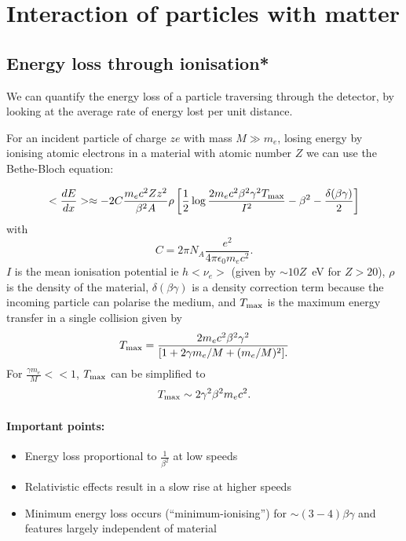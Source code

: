 \section{Interaction of particles with matter}
\label{sec:interaction_particle_matter}

\subsection{Energy loss through ionisation*}
We can quantify the energy loss of a particle traversing through the detector, by looking at the average rate of energy lost per unit distance.


For an incident particle of charge $ze$ with mass $M\gg m_e$, losing energy by ionising atomic electrons in a material with atomic number $Z$ we can use the Bethe-Bloch equation:

\begin{equation}
\label{eq:bethebloch}
<\frac{dE}{dx}>\approx -2C\frac{m_ec^2Zz^2}{\beta^2A}\rho\left[\frac{1}{2}\log\frac{2m_ec^2\beta^2\gamma^2T_{\rm max}}{I^2}-\beta^2-\frac{\delta(\beta\gamma)}{2}\right]
\end{equation}
with \[C=2\pi N_A\frac{e^2}{4\pi\epsilon_0m_ec^2}.\] 
$I$ is the mean ionisation potential ie $h<\nu_e>$ (given by $\sim10Z$~eV for $Z>20$), $\rho$ is the density of the material, $\delta(\beta\gamma)$ is a density correction term because the incoming particle can polarise the medium, and $T_{\rm max}$ is the maximum energy transfer in a single collision given by
\[
T_{\rm max}=\frac{2m_ec^2\beta^2\gamma^2}{[1+2\gamma m_e/M +(m_e/M)^2].}
\]
For $\frac{\gamma m_e}{M}<<1$, $T_{\rm max}$ can be simplified to
\[
T_{\rm max}\sim2\gamma^2\beta^2m_ec^2.
\]

\paragraph{Important points:}
\begin{itemize}
\item Energy loss proportional to $\frac{1}{\beta^2}$ at low speeds
\item Relativistic effects result in a slow rise at higher speeds
\item Minimum energy loss occurs (``minimum-ionising'') for $\sim (3-4)\beta\gamma$ and features largely independent of material
\end{itemize}

